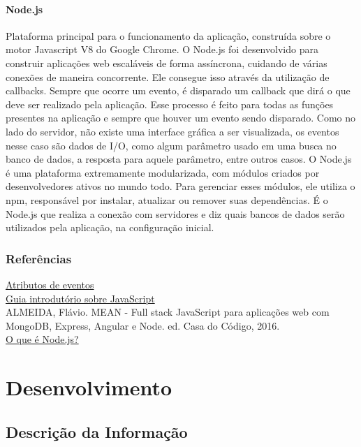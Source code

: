 \documentclass[
	12pt,				%
	oneside,			%
	a4paper,			%
	brazil				%
]{abntex2}
\begin{document}
\subsubsection{Node.js}

Plataforma principal para o funcionamento da aplicação, construída sobre o motor Javascript V8 do Google Chrome.
O Node.js foi desenvolvido para construir aplicações web escaláveis de forma assíncrona, cuidando de várias conexões de maneira concorrente. Ele consegue isso através da utilização de callbacks. 
Sempre que ocorre um evento, é disparado um callback que dirá o que deve ser realizado pela aplicação. Esse processo é feito para todas as funções presentes na aplicação e sempre que houver um evento sendo disparado.
Como no lado do servidor, não existe uma interface gráfica a ser visualizada, os eventos nesse caso são dados de I/O, como algum parâmetro usado em uma busca no banco de dados, a resposta para aquele parâmetro, entre outros casos.
O Node.js é uma plataforma extremamente modularizada, com módulos criados por desenvolvedores ativos no mundo todo.
Para gerenciar esses módulos, ele utiliza o npm, responsável por instalar, atualizar ou remover suas dependências. 
É o Node.js que realiza a conexão com servidores e diz quais bancos de dados serão utilizados pela aplicação, na configuração inicial.


\subsection{Referências}

\href{https://www.w3schools.com/tags/ref_eventattributes.asp}{Atributos de eventos}\\
\href{http://tableless.github.io/iniciantes/manual/js/}{Guia introdutório sobre JavaScript}\\

ALMEIDA, Flávio. MEAN - Full stack JavaScript para aplicações web com MongoDB, Express, Angular e Node. ed. Casa do Código, 2016.\\
\href{http://nodebr.com/o-que-e-node-js/}{O que é Node.js?} %


\chapter{Desenvolvimento}

\section{Descrição da Informação}
\end{document}

